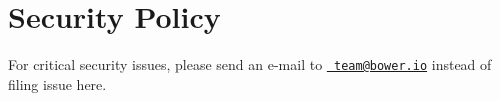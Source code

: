 \chapter{Security Policy}
\hypertarget{md__c_1_2_users_2_s_t_r_i_d_e_r_2source_2repos_2_internal_a_p_i_2_internal_a_p_i_2wwwroot_2lib_2293760dcb5e306a81883317120a65020}{}\label{md__c_1_2_users_2_s_t_r_i_d_e_r_2source_2repos_2_internal_a_p_i_2_internal_a_p_i_2wwwroot_2lib_2293760dcb5e306a81883317120a65020}
\label{md__c_1_2_users_2_s_t_r_i_d_e_r_2source_2repos_2_internal_a_p_i_2_internal_a_p_i_2wwwroot_2lib_2293760dcb5e306a81883317120a65020_autotoc_md5371}%
%
 For critical security issues, please send an e-\/mail to \href{mailto:team@bower.io}{\texttt{ team@bower.\+io}} instead of filing issue here. 